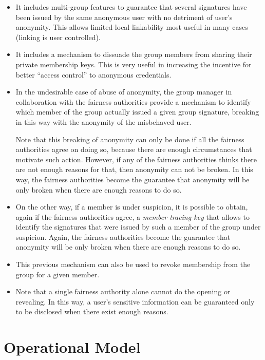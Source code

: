 \documentclass[a4paper]{article}
\begin{document}
\begin{itemize}
\item 
It includes multi-group features to guarantee that several signatures
have been issued by the same anonymous user with no detriment of
user’s anonymity. This allows limited local linkability most useful in
many cases (linking is user controlled).

\item 
It includes a mechanism to dissuade the group members from sharing
their private membership keys. This is very useful in increasing the
incentive for better “access control” to anonymous credentials.

\item 
In the undesirable case of abuse of anonymity, the group manager in
collaboration with the fairness authorities provide a mechanism to
identify which member of the group actually issued a given group
signature, breaking in this way with the anonymity of the misbehaved
user.

Note that this breaking of anonymity can only be done if all the
fairness authorities agree on doing so, because there are enough
circumstances that motivate such action. However, if any of the
fairness authorities thinks there are not enough reasons for that,
then anonymity can not be broken. In this way, the fairness
authorities become the guarantee that anonymity will be only broken
when there are enough reasons to do so.

\item
On the other way, if a member is under suspicion, it is possible to
obtain, again if the fairness authorities agree, a \emph{member
  tracing key} that allows to identify the signatures that were issued
by such a member of the group under suspicion. Again, the fairness
authorities become the guarantee that anonymity will be only broken
when there are enough reasons to do so.

\item
This previous mechanism can also be used to revoke membership from the
group for a given member.

\item 
Note that a single fairness authority alone cannot do the opening or
revealing. In this way, a user’s sensitive information can be
guaranteed only to be disclosed when there exist enough reasons.

\end{itemize}%


\section{Operational Model}
\end{document}
